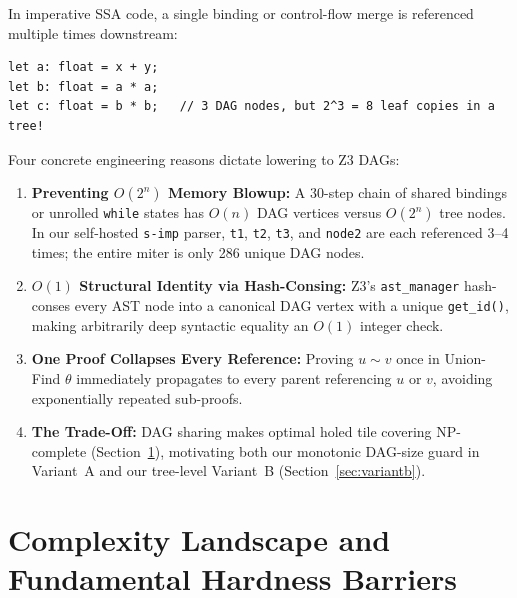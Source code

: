 \documentclass[11pt,a4paper]{article}
\begin{document}
In imperative SSA code, a single binding or control-flow merge is referenced multiple times downstream:
\begin{lstlisting}[caption={Exponential tree blowup vs.\ linear DAG sharing in \texttt{s-imp}.}]
let a: float = x + y;
let b: float = a * a;
let c: float = b * b;   // 3 DAG nodes, but 2^3 = 8 leaf copies in a tree!
\end{lstlisting}
Four concrete engineering reasons dictate lowering to Z3 DAGs:
\begin{enumerate}
  \item \textbf{Preventing $O(2^n)$ Memory Blowup:} A 30-step chain of shared bindings or unrolled \texttt{while} states has $O(n)$ DAG vertices versus $O(2^n)$ tree nodes. In our self-hosted \texttt{s-imp} parser, \texttt{t1}, \texttt{t2}, \texttt{t3}, and \texttt{node2} are each referenced 3--4 times; the entire miter is only 286 unique DAG nodes.
  \item \textbf{$O(1)$ Structural Identity via Hash-Consing:} Z3's \texttt{ast\_manager} hash-conses every AST node into a canonical DAG vertex with a unique \texttt{get\_id()}, making arbitrarily deep syntactic equality an $O(1)$ integer check.
  \item \textbf{One Proof Collapses Every Reference:} Proving $u \sim v$ once in Union-Find $\theta$ immediately propagates to every parent referencing $u$ or $v$, avoiding exponentially repeated sub-proofs.
  \item \textbf{The Trade-Off:} DAG sharing makes optimal holed tile covering NP-complete (Section~\ref{sec:complexity}), motivating both our monotonic DAG-size guard in Variant~A and our tree-level Variant~B (Section~\ref{sec:variantb}).
\end{enumerate}

\section{Complexity Landscape and Fundamental Hardness Barriers}
\label{sec:complexity}
\end{document}
